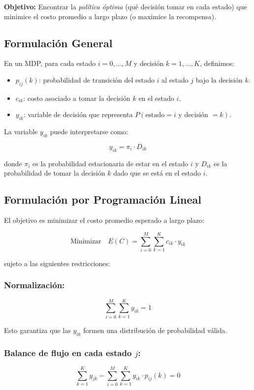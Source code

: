\documentclass[a4paper,11pt]{article}
\begin{document}
\textbf{Objetivo:} Encontrar la \textit{política óptima} (qué decisión tomar en cada estado) que minimice el costo promedio a largo plazo (o maximice la recompensa).

\subsection{Formulación General}

En un MDP, para cada estado $i = 0, \ldots, M$ y decisión $k = 1, \ldots, K$, definimos:

\begin{itemize}
    \item $p_{ij}(k)$: probabilidad de transición del estado $i$ al estado $j$ bajo la decisión $k$.
    \item $c_{ik}$: costo asociado a tomar la decisión $k$ en el estado $i$.
    \item $y_{ik}$: variable de decisión que representa $P(\text{estado} = i \text{ y decisión } = k)$.
\end{itemize}

La variable $y_{ik}$ puede interpretarse como:

\[y_{ik} = \pi_i \cdot D_{ik}\]

donde $\pi_i$ es la probabilidad estacionaria de estar en el estado $i$ y $D_{ik}$ es la probabilidad de tomar la decisión $k$ dado que se está en el estado $i$.

\subsection{Formulación por Programación Lineal}

El objetivo es minimizar el costo promedio esperado a largo plazo:

\[\text{Minimizar} \quad E(C) = \sum_{i=0}^{M} \sum_{k=1}^{K} c_{ik} \cdot y_{ik}\]

sujeto a las siguientes restricciones:

\subsubsection{Normalización:}
\[\sum_{i=0}^{M} \sum_{k=1}^{K} y_{ik} = 1\]

Esto garantiza que las $y_{ik}$ formen una distribución de probabilidad válida.

\subsubsection{Balance de flujo en cada estado $j$:}
\[\sum_{k=1}^{K} y_{jk} - \sum_{i=0}^{M} \sum_{k=1}^{K} y_{ik} \cdot p_{ij}(k) = 0\]
\end{document}
